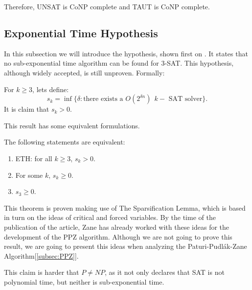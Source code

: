 Therefore, UNSAT is CoNP complete and TAUT is CoNP complete.

\subsection{Exponential Time Hypothesis}
\label{hyp:exponential_time}
In this subsection we will introduce the hypothesis, shown first on \cite{impagliazzo2001complexity}. It states that no sub-exponential time algorithm can be found for 3-SAT. This hypothesis, although widely accepted, is still unproven. Formally:

\begin{definition}[ETH]
  For $k\ge 3$, lets define:
  $$s_k=\inf\{\delta: \text{there exists a } O(2^{\delta n})\ \ k-\text{ SAT solver}\}.$$
  It is claim that $s_k>0$.
\end{definition}

This result has some equivalent formulations.

\begin{proposition}
  The following statements are equivalent:
  \begin{enumerate}
  \item ETH: for all $k\ge 3$, $s_k > 0$.
  \item For some $k$, $s_k \ge 0$.
  \item $s_3 \ge 0$.

  \end{enumerate}
  \end{proposition}

This theorem is proven making use of The Sparsification Lemma, which is based in turn on the ideas of critical and forced variables. By the time of the publication of the article, Zane has already worked with these ideas for the development of the PPZ algorithm\cite{paturi1997satisfiability}. Although we are not going to prove this result, we are going to present this ideas when analyzing the Paturi-Pudlák-Zane Algorithm[\ref{subsec:PPZ}].
 
This claim is harder that $P\ne NP$, as it not only declares that SAT is not polynomial time, but neither is sub-exponential time. 







